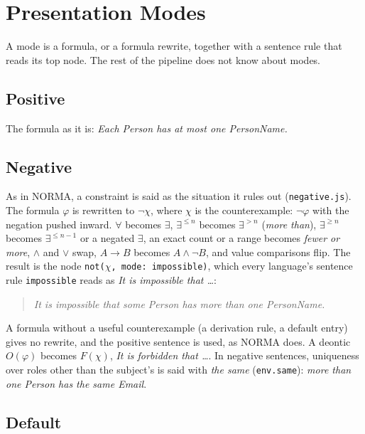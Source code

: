 \documentclass[11pt, a4paper]{article}
\newcommand{\code}[1]{\texttt{\color{codefg}#1}}
\begin{document}
\section{Presentation Modes}
\label{sec:modes}

A mode is a formula, or a formula rewrite, together with a sentence rule
that reads its top node. The rest of the pipeline does not know about modes.

\subsection{Positive}

The formula as it is: \textit{Each Person has at most one PersonName.}

\subsection{Negative}

As in NORMA, a constraint is said as the situation it rules out
(\code{negative.js}). The formula $\varphi$ is rewritten to $\neg\chi$, where
$\chi$ is the counterexample: $\neg\varphi$ with the negation pushed inward.
$\forall$ becomes $\exists$, $\exists^{\le n}$ becomes $\exists^{>n}$
(\textit{more than}), $\exists^{\ge n}$ becomes $\exists^{\le n-1}$ or a
negated $\exists$, an exact count or a range becomes \textit{fewer or more},
$\wedge$ and $\vee$ swap, $A \to B$ becomes $A \wedge \neg B$, and value
comparisons flip. The result is the node \code{not(}$\chi$\code{, mode:
impossible)}, which every language's sentence rule \code{impossible} reads
as \textit{It is impossible that \ldots}:

\begin{quote}
\textit{It is impossible that some Person has more than one PersonName.}
\end{quote}

A formula without a useful counterexample (a derivation rule, a default
entry) gives no rewrite, and the positive sentence is used, as NORMA does. A
deontic $O(\varphi)$ becomes $F(\chi)$, \textit{It is forbidden that
\ldots}. In negative sentences, uniqueness over roles other than the
subject's is said with \textit{the same} (\code{env.same}): \textit{more than
one Person has the same Email}.

\subsection{Default}
\label{sec:default}
\end{document}
